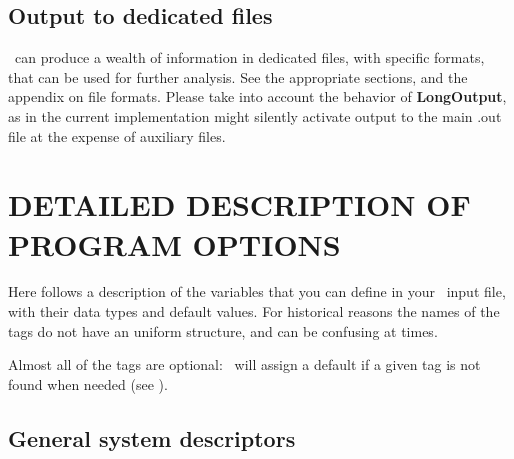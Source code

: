 \subsection{Output to dedicated files} 

\siesta\ can produce a wealth of information in dedicated files,
with specific formats, that can be used for further analysis. See the
appropriate sections, and the appendix on file formats.
Please take into account the behavior of
\textbf{LongOutput}, as in the current implementation might silently
activate output to the main .out file at the expense of auxiliary
files.

\section{DETAILED DESCRIPTION OF PROGRAM OPTIONS}


Here follows a description of the variables that you can define in
your \siesta\ input file, with their data types and default
values. For historical reasons the names of the tags do not have an
uniform structure, and can be confusing at times.

Almost all of the tags are optional: \siesta\ will assign a
default if a given tag is not found when needed (see ).


\vspace{5pt}
\subsection{General system descriptors}

